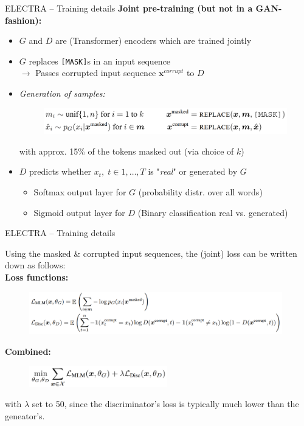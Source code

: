 \documentclass[]{beamer}
\renewcommand{\vec}[1]{\mathbf{#1}}
\begin{document}
\begin{frame}{ELECTRA -- Training details}
	\textbf{Joint pre-training (but \textbf{not} in a GAN-fashion):}

	\begin{itemize}
		\item $G$ and $D$ are (Transformer) encoders which are trained jointly
		\item $G$ replaces \texttt{[MASK]}s in an input sequence\\
					$\rightarrow$ Passes corrupted input sequence $\vec{x}^{corrupt}$ to $D$
		\item \textit{Generation of samples:}
	\begin{figure}
		\centering
		\includegraphics[width = 11cm]{figure/electra-samples.png}
	\end{figure}\vspace{-.25cm}
		{\footnotesize with approx. 15\% of the tokens masked out (via choice of $k$)}
		\item $D$ predicts whether $x_t,\; t \in 1, \hdots, T$ is "\textit{real}" or generated by $G$
			\begin{itemize}
				\item Softmax output layer for $G$ (probability distr. over all words)
				\item Sigmoid output layer for $D$ (Binary classification real vs. generated)
			\end{itemize}
	\end{itemize}
\end{frame}



\begin{frame}{ELECTRA -- Training details}

	Using the masked \& corrupted input sequences, the (joint) loss can be written down as follows:\\
	\vspace{.3cm}
	\textbf{Loss functions:}
	\begin{figure}
		\centering
		\includegraphics[width = 11cm]{figure/electra-loss.png}
	\end{figure}
	
	\textbf{Combined:}
	\begin{figure}
		\centering
		\includegraphics[width = 6cm]{figure/electra-loss-comb.png}
	\end{figure}
	{\footnotesize with $\lambda$ set to 50, since the discriminator's loss is typically much lower than the geneator's.}
\end{frame}
\end{document}
